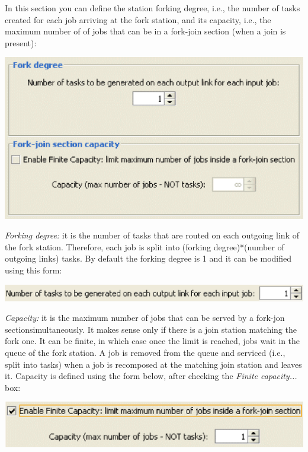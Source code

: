 In this section you can define the station forking degree, i.e., the number of tasks created for each job arriving at the fork station, and its capacity, i.e., the maximum number of of jobs that can be in a fork-join section (when a join is present):\\
\begin{center}
\includegraphics[scale=.5]{img/jsim/fork1.eps}
\end{center}
\emph{Forking degree:} it is the number of tasks that are routed on each outgoing link of the fork station. Therefore, each job is split into (forking degree)*(number of outgoing links) tasks. By default the forking degree is 1 and it can be modified using this form:\\
\begin{center}
\includegraphics[scale=.5]{img/jsim/tasks.eps}
\end{center}
\emph{Capacity:} it is the maximum number of jobs that can be served by a fork-jon sectionsimultaneously. It makes sense only if there is a join station matching the fork one. It can be finite, in which case once the limit is reached, jobs wait in the queue of the fork station. A job is removed from the queue and serviced (i.e., split into tasks) when a job is recomposed at the matching join station and leaves it. Capacity is defined using the form below, after checking the \emph{Finite capacity...} box:\\
\begin{center}
\includegraphics[scale=.5]{img/jsim/blocking.eps}
\end{center}

